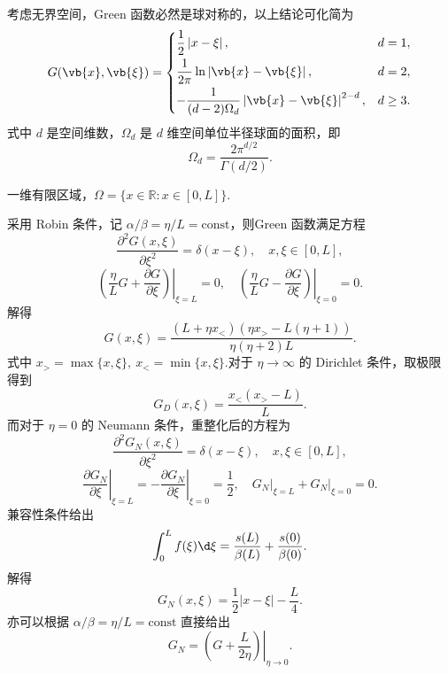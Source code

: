 考虑无界空间，Green 函数必然是球对称的，以上结论可化简为
\begin{equation*}
	G(\vb{x},\vb{\xi})=
	\begin{cases}
		\dfrac{1}{2}\left|x-\xi\right|, & d=1,\\[6pt]
		\dfrac{1}{2\pi}\ln\left|\vb{x}-\vb{\xi}\right|, & d=2,\\[6pt]
		-\dfrac{1}{(d-2)\Omega_d}\left|\vb{x}-\vb{\xi}\right|^{2-d}, & d\geq3.
	\end{cases}
\end{equation*}
式中 \(d\) 是空间维数，\(\Omega_d\) 是 \(d\) 维空间单位半径球面的面积，即
\begin{equation*}
	\Omega_d=\frac{2\pi^{d/2}}{\Gamma(d/2)}.
\end{equation*}

\begin{example}
	一维有限区域，\(\Omega=\{x\in\mathbb{R}:x\in[0,L]\}\).
	
	采用 Robin 条件，记 \(\alpha/\beta=\eta/L=\mathrm{const}\)，则Green 函数满足方程
	\begin{equation*}
		\frac{\partial^2G(x,\xi)}{\partial\xi^2}=\delta(x-\xi),\quad x,\xi\in[0,L],
	\end{equation*}
	\begin{equation*}
		\left.\left(\frac{\eta}{L}G+\frac{\partial G}{\partial\xi}\right)\right|_{\xi=L}=0,
		\quad
		\left.\left(\frac{\eta}{L}G-\frac{\partial G}{\partial\xi}\right)\right|_{\xi=0}=0.
	\end{equation*}
	解得
	\begin{equation*}
		G(x,\xi)=\frac{(L+\eta x_<)(\eta x_>-L(\eta+1))}{\eta(\eta+2)L}.
	\end{equation*}
	式中 \(x_>=\max\{x,\xi\},\ x_<=\min\{x,\xi\}\).对于 \(\eta\to\infty\) 的 Dirichlet 条件，取极限得到
	\begin{equation*}
		G_D(x,\xi)=\frac{x_<(x_>-L)}{L}.
	\end{equation*}
	而对于 \(\eta=0\) 的 Neumann 条件，重整化后的方程为
	\begin{equation*}
		\frac{\partial^2G_N(x,\xi)}{\partial\xi^2}=\delta(x-\xi),\quad x,\xi\in[0,L],
	\end{equation*}
	\begin{equation*}
		\left.\frac{\partial G_N}{\partial\xi}\right|_{\xi=L}
		=-\left.\frac{\partial G_N}{\partial\xi}\right|_{\xi=0}
		=\frac{1}{2},\quad
		\left.G_N\right|_{\xi=L}+\left.G_N\right|_{\xi=0}=0.
	\end{equation*}
	兼容性条件给出
	\begin{equation*}
		\int_0^L f(\xi)\d\xi=\frac{s(L)}{\beta(L)}+\frac{s(0)}{\beta(0)}.
	\end{equation*}
	解得
	\begin{equation*}
		G_N(x,\xi)=\frac{1}{2}\left|x-\xi\right|-\frac{L}{4}.
	\end{equation*}
	亦可以根据 \(\alpha/\beta=\eta/L=\mathrm{const}\) 直接给出
	\begin{equation*}
		G_N=\left.\left(G+\frac{L}{2\eta}\right)\right|_{\eta\to0}.
	\end{equation*}
\end{example}

